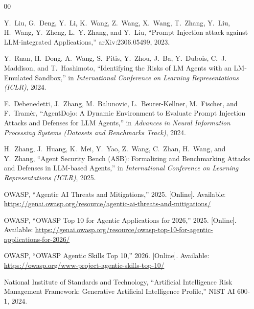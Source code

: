 \documentclass[conference]{IEEEtran}
\begin{document}
\begin{thebibliography}{00}

Y.~Liu, G.~Deng, Y.~Li, K.~Wang, Z.~Wang, X.~Wang, T.~Zhang, Y.~Liu, H.~Wang, Y.~Zheng, L.~Y. Zhang, and Y.~Liu, ``Prompt Injection attack against LLM-integrated Applications,'' arXiv:2306.05499, 2023.

Y.~Ruan, H.~Dong, A.~Wang, S.~Pitis, Y.~Zhou, J.~Ba, Y.~Dubois, C.~J. Maddison, and T.~Hashimoto, ``Identifying the Risks of LM Agents with an LM-Emulated Sandbox,'' in \emph{International Conference on Learning Representations (ICLR)}, 2024.

E.~Debenedetti, J.~Zhang, M.~Balunovic, L.~Beurer-Kellner, M.~Fischer, and F.~Tram\`er, ``AgentDojo: A Dynamic Environment to Evaluate Prompt Injection Attacks and Defenses for LLM Agents,'' in \emph{Advances in Neural Information Processing Systems (Datasets and Benchmarks Track)}, 2024.

H.~Zhang, J.~Huang, K.~Mei, Y.~Yao, Z.~Wang, C.~Zhan, H.~Wang, and Y.~Zhang, ``Agent Security Bench (ASB): Formalizing and Benchmarking Attacks and Defenses in LLM-based Agents,'' in \emph{International Conference on Learning Representations (ICLR)}, 2025.

OWASP, ``Agentic AI Threats and Mitigations,'' 2025. [Online]. Available: \url{https://genai.owasp.org/resource/agentic-ai-threats-and-mitigations/}

OWASP, ``OWASP Top 10 for Agentic Applications for 2026,'' 2025. [Online]. Available: \url{https://genai.owasp.org/resource/owasp-top-10-for-agentic-applications-for-2026/}

OWASP, ``OWASP Agentic Skills Top 10,'' 2026. [Online]. Available: \url{https://owasp.org/www-project-agentic-skills-top-10/}

National Institute of Standards and Technology, ``Artificial Intelligence Risk Management Framework: Generative Artificial Intelligence Profile,'' NIST AI 600-1, 2024.

\end{thebibliography}
\end{document}
